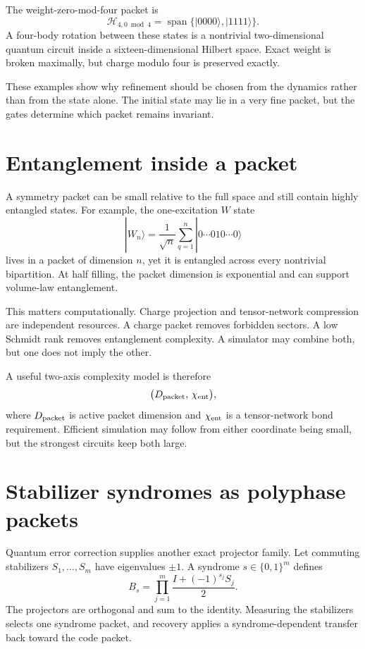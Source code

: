 \documentclass[11pt]{article}
\newcommand{\Hh}{\mathcal H}
\begin{document}
The weight-zero-mod-four packet is
\[
        \Hh_{4,0\bmod4}=\operatorname{span}\{|0000\rangle,|1111\rangle\}.
\]
A four-body rotation between these states is a nontrivial two-dimensional quantum circuit inside a sixteen-dimensional Hilbert space.  Exact weight is broken maximally, but charge modulo four is preserved exactly.

These examples show why refinement should be chosen from the dynamics rather than from the state alone.  The initial state may lie in a very fine packet, but the gates determine which packet remains invariant.

\section{Entanglement inside a packet}

A symmetry packet can be small relative to the full space and still contain highly entangled states.  For example, the one-excitation $W$ state
\[
        |W_n\rangle=\frac1{\sqrt n}\sum_{q=1}^n|0\cdots010\cdots0\rangle
\]
lives in a packet of dimension $n$, yet it is entangled across every nontrivial bipartition.  At half filling, the packet dimension is exponential and can support volume-law entanglement.

This matters computationally.  Charge projection and tensor-network compression are independent resources.  A charge packet removes forbidden sectors.  A low Schmidt rank removes entanglement complexity.  A simulator may combine both, but one does not imply the other.

A useful two-axis complexity model is therefore
\[
        \bigl(D_{\rm packet},\,\chi_{\rm ent}\bigr),
\]
where $D_{\rm packet}$ is active packet dimension and $\chi_{\rm ent}$ is a tensor-network bond requirement.  Efficient simulation may follow from either coordinate being small, but the strongest circuits keep both large.

\section{Stabilizer syndromes as polyphase packets}

Quantum error correction supplies another exact projector family.  Let commuting stabilizers $S_1,\ldots,S_m$ have eigenvalues $\pm1$.  A syndrome $s\in\{0,1\}^m$ defines
\[
        B_s=\prod_{j=1}^m\frac{I+(-1)^{s_j}S_j}{2}.
\]
The projectors are orthogonal and sum to the identity.  Measuring the stabilizers selects one syndrome packet, and recovery applies a syndrome-dependent transfer back toward the code packet.
\end{document}

